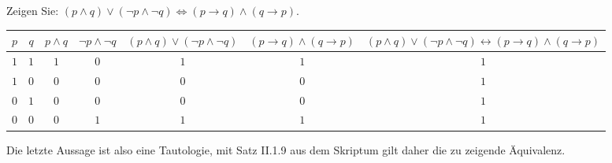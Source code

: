 
\begin{exercise}[19]

Zeigen Sie:
$(p \land q) \lor (\neg p \land \neg q) \Leftrightarrow (p \to q) \land (q \to p)$.

\end{exercise}


\begin{solution}
\begin{tabular}{|c|c|c|c|c|c|c|}
\hline
$p$ & $q$ & $p \land q$ & $\neg p \land \neg q$ & $(p \land q) \lor (\neg p \land \neg q)$ & $(p \to q) \land (q \to p)$
& $(p \land q) \lor (\neg p \land \neg q) \leftrightarrow (p \to q) \land (q \to p)$\\
\hline
$1$ & $1$ & $1$ & $0$ & $1$ & $1$ & $1$\\
\hline
$1$ & $0$ & $0$ & $0$ & $0$ & $0$ & $1$\\
\hline
$0$ & $1$ & $0$ & $0$ & $0$ & $0$ & $1$\\
\hline
$0$ & $0$ & $0$ & $1$ & $1$ & $1$ & $1$\\
\hline
\end{tabular}
Die letzte Aussage ist also eine Tautologie, mit Satz II.1.9 aus dem Skriptum gilt daher die zu zeigende Äquivalenz.

\end{solution}


